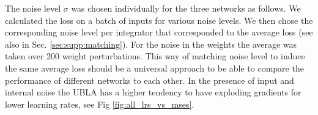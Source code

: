 \documentclass{article} %
\newcounter{ct}
\theoremstyle{definition}
\theoremstyle{remark}
\begin{document}
The noise level $\sigma$ was chosen individually for the three networks as follows. 
We calculated the loss on a batch of inputs for various noise levels.
We then chose the corresponding noise level per integrator that corresponded to the average loss (see also in Sec. \ref{sec:supp:matching}). For the noise in the weights the average was taken over 200 weight perturbations.
This way of matching noise level to induce the same average loss should be a universal approach to be able to compare the performance of different networks to each other.
In the presence of input and internal noise the UBLA has a higher tendency to have exploding gradients for lower learning rates, see Fig \ref{fig:all_lrs_vs_mses}. 

%

\end{document}

